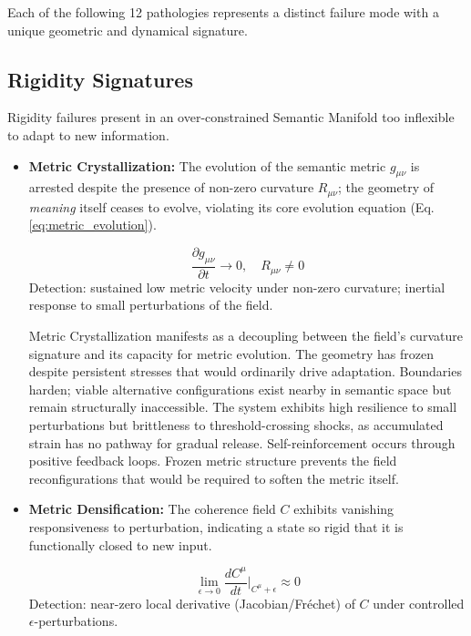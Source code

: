 Each of the following 12 pathologies represents a distinct failure mode with a unique geometric and dynamical signature.


\subsection{Rigidity Signatures}
\label{16.2.1:rigidity_signatures}

Rigidity failures present in an over-constrained Semantic Manifold too inflexible to adapt to new information.

\begin{itemize}
    
    \item \textbf{Metric Crystallization:} The evolution of the semantic metric \(g_{\mu\nu}\) is arrested despite the presence of non-zero curvature \(R_{\mu\nu}\); the geometry of \textit{meaning} itself ceases to evolve, violating its core evolution equation (Eq. \ref{eq:metric_evolution}).

    \begin{equation}
    \frac{\partial g_{\mu\nu}}{\partial t} \to 0, \quad R_{\mu\nu} \neq 0
    \end{equation}
    Detection: sustained low metric velocity under non-zero curvature; inertial response to small perturbations of the field.

    Metric Crystallization manifests as a decoupling between the field's curvature signature and its capacity for metric evolution. The geometry has frozen despite persistent stresses that would ordinarily drive adaptation. Boundaries harden; viable alternative configurations exist nearby in semantic space but remain structurally inaccessible. The system exhibits high resilience to small perturbations but brittleness to threshold-crossing shocks, as accumulated strain has no pathway for gradual release. Self-reinforcement occurs through positive feedback loops. Frozen metric structure prevents the field reconfigurations that would be required to soften the metric itself.
    
    \item \textbf{Metric Densification:} The coherence field \(C\) exhibits vanishing responsiveness to perturbation, indicating a state so rigid that it is functionally closed to new input.

    \begin{equation}
    \lim_{\epsilon \to 0} \frac{dC^\mu}{dt}\bigg|_{C^\mu+\epsilon} \approx 0
    \end{equation}
    Detection: near-zero local derivative (Jacobian/Fréchet) of \(C\) under controlled \(\epsilon\)-perturbations.


\end{itemize}
